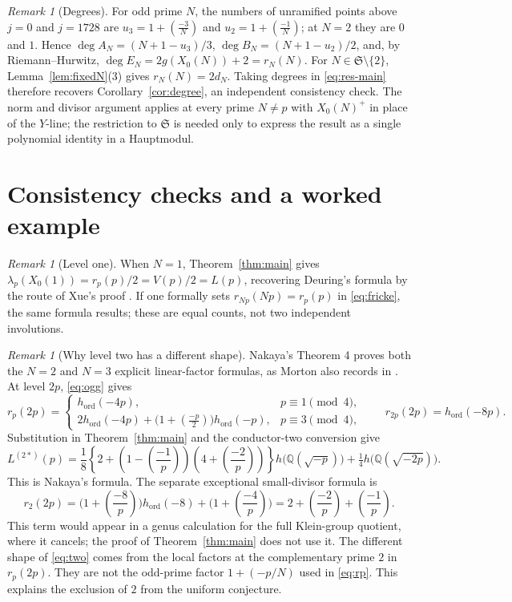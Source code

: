 \documentclass[11pt,a4paper]{article}
\theoremstyle{remark}\newtheorem{remark}[theorem]{Remark}
\numberwithin{equation}{section}
\newcommand{\Q}{\mathbb Q}\newcommand{\Z}{\mathbb Z}
\newcommand{\leg}[2]{\left(\frac{#1}{#2}\right)}
\newcommand{\ho}{h_{\mathrm{ord}}}
\newcommand{\hK}[1]{h\bigl(\Q(\sqrt{-#1})\bigr)}
\begin{document}
	\begin{remark}[Degrees]\label{rem:res-degree}
		For odd prime $N$, the numbers of unramified points above $j=0$ and $j=1728$ are $u_3=1+\leg{-3}{N}$ and $u_2=1+\leg{-1}{N}$; at $N=2$ they are $0$ and $1$. Hence $\deg A_N=(N+1-u_3)/3$, $\deg B_N=(N+1-u_2)/2$, and, by Riemann--Hurwitz, $\deg E_N=2g(X_0(N))+2=r_N(N)$. For $N\in\mathfrak S\setminus\{2\}$, Lemma~\ref{lem:fixedN}(3) gives $r_N(N)=2d_N$. Taking degrees in \eqref{eq:res-main} therefore recovers Corollary~\ref{cor:degree}, an independent consistency check. The norm and divisor argument applies at every prime $N\neq p$ with $X_0(N)^+$ in place of the $Y$-line; the restriction to $\mathfrak S$ is needed only to express the result as a single polynomial identity in a Hauptmodul.
	\end{remark}
	
	
	
	\section{Consistency checks and a worked example}\label{sec:examples}
	\begin{remark}[Level one]
		When $N=1$, Theorem~\ref{thm:main} gives $\lambda_p(X_0(1))=r_p(p)/2=V(p)/2=L(p)$, recovering Deuring's formula by the route of Xue's proof \cite[Theorem 2]{Xue}. If one formally sets $r_{Np}(Np)=r_p(p)$ in \eqref{eq:fricke}, the same formula results; these are equal counts, not two independent involutions.
	\end{remark}
	
	\begin{remark}[Why level two has a different shape]\label{rem:two}
		Nakaya's Theorem 4 proves both the $N=2$ and $N=3$ explicit linear-factor formulas, as Morton also records in \cite{MortonFricke}. At level $2p$, \eqref{eq:ogg} gives
		\[
		r_p(2p)=\begin{cases}
			\ho(-4p),&p\equiv1\pmod4,\\
			2\ho(-4p)+\bigl(1+\leg{-p}{2}\bigr)\ho(-p),&p\equiv3\pmod4,
		\end{cases}
		\qquad r_{2p}(2p)=\ho(-8p).
		\]
		Substitution in Theorem~\ref{thm:main} and the conductor-two conversion give
		\begin{equation}\label{eq:two}
			L^{(2*)}(p)=\frac18\left\{2+\left(1-\leg{-1}{p}\right)
			\left(4+\leg{-2}{p}\right)\right\}\hK{p}
			+\tfrac14\hK{2p}.
		\end{equation}
		This is Nakaya's formula. The separate exceptional small-divisor formula is
		\[
		r_2(2p)=\bigl(1+\leg{-8}{p}\bigr)\ho(-8)
		+\bigl(1+\leg{-4}{p}\bigr)
		=2+\leg{-2}{p}+\leg{-1}{p}.
		\]
		This term would appear in a genus calculation for the full Klein-group quotient, where it cancels; the proof of Theorem~\ref{thm:main} does not use it. The different shape of \eqref{eq:two} comes from the local factors at the complementary prime $2$ in $r_p(2p)$. They are not the odd-prime factor $1+(-p/N)$ used in \eqref{eq:rp}. This explains the exclusion of $2$ from the uniform conjecture.
	\end{remark}
	
\end{document}
